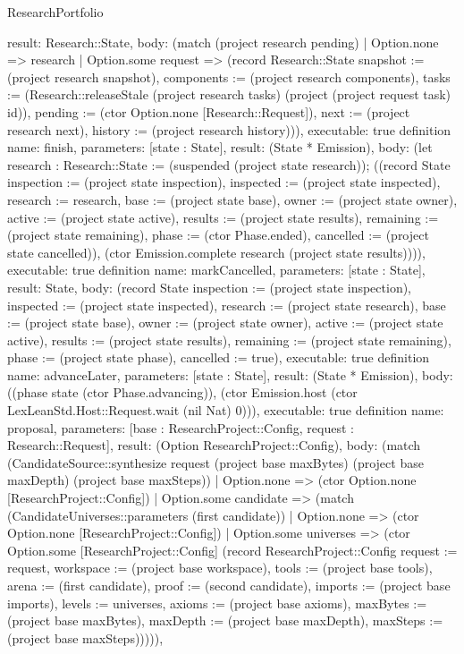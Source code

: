 \begin{lexlean}{ResearchPortfolio}
\begin{semanticmodule}
{ result: Research::State,
 body: (match (project research pending) | Option.none => research | Option.some request => (record Research::State {snapshot := (project research snapshot), components := (project research components), tasks := (Research::releaseStale (project research tasks) (project (project request task) id)), pending := (ctor Option.none [Research::Request]), next := (project research next), history := (project research history)})),
 executable: true
}
definition{
 name: finish,
 parameters: [state : State],
 result: (State * Emission),
 body: (let research : Research::State := (suspended (project state research)); ((record State {inspection := (project state inspection), inspected := (project state inspected), research := research, base := (project state base), owner := (project state owner), active := (project state active), results := (project state results), remaining := (project state remaining), phase := (ctor Phase.ended), cancelled := (project state cancelled)}), (ctor Emission.complete research (project state results)))),
 executable: true
}
definition{
 name: markCancelled,
 parameters: [state : State],
 result: State,
 body: (record State {inspection := (project state inspection), inspected := (project state inspected), research := (project state research), base := (project state base), owner := (project state owner), active := (project state active), results := (project state results), remaining := (project state remaining), phase := (project state phase), cancelled := true}),
 executable: true
}
definition{
 name: advanceLater,
 parameters: [state : State],
 result: (State * Emission),
 body: ((phase state (ctor Phase.advancing)), (ctor Emission.host (ctor LexLeanStd.Host::Request.wait (nil Nat) 0))),
 executable: true
}
definition{
 name: proposal,
 parameters: [base : ResearchProject::Config, request : Research::Request],
 result: (Option ResearchProject::Config),
 body: (match (CandidateSource::synthesize request (project base maxBytes) (project base maxDepth) (project base maxSteps)) | Option.none => (ctor Option.none [ResearchProject::Config]) | Option.some candidate => (match (CandidateUniverses::parameters (first candidate)) | Option.none => (ctor Option.none [ResearchProject::Config]) | Option.some universes => (ctor Option.some [ResearchProject::Config] (record ResearchProject::Config {request := request, workspace := (project base workspace), tools := (project base tools), arena := (first candidate), proof := (second candidate), imports := (project base imports), levels := universes, axioms := (project base axioms), maxBytes := (project base maxBytes), maxDepth := (project base maxDepth), maxSteps := (project base maxSteps)})))),
}
\end{semanticmodule}
\end{lexlean}
